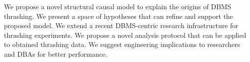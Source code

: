 We propose a novel structural causal model to explain the origins of DBMS thrashing.
We present a space of hypotheses that can refine and support the proposed model.
We extend a recent DBMS-centric research infrastructure for thrashing experiments.
We propose a novel analysis protocol that can be applied to obtained thrashing data.
We suggest engineering implications to researchers and DBAs for better performance.
